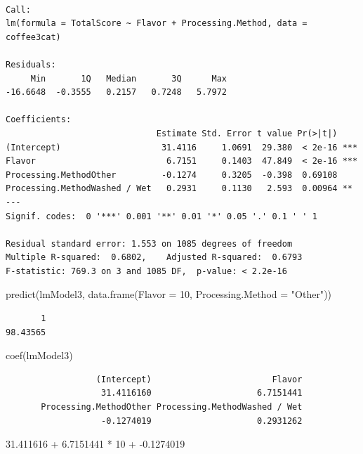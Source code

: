 \documentclass[
  letterpaper,
  DIV=11,
  numbers=noendperiod]{scrreprt}
\newenvironment{Shaded}{\begin{snugshade}}{\end{snugshade}}
\newcommand{\AttributeTok}[1]{\textcolor[rgb]{0.40,0.45,0.13}{#1}}
\newcommand{\DecValTok}[1]{\textcolor[rgb]{0.68,0.00,0.00}{#1}}
\newcommand{\FloatTok}[1]{\textcolor[rgb]{0.68,0.00,0.00}{#1}}
\newcommand{\FunctionTok}[1]{\textcolor[rgb]{0.28,0.35,0.67}{#1}}
\newcommand{\NormalTok}[1]{\textcolor[rgb]{0.00,0.23,0.31}{#1}}
\newcommand{\SpecialCharTok}[1]{\textcolor[rgb]{0.37,0.37,0.37}{#1}}
\newcommand{\StringTok}[1]{\textcolor[rgb]{0.13,0.47,0.30}{#1}}
\begin{document}
\begin{verbatim}

Call:
lm(formula = TotalScore ~ Flavor + Processing.Method, data = coffee3cat)

Residuals:
     Min       1Q   Median       3Q      Max 
-16.6648  -0.3555   0.2157   0.7248   5.7972 

Coefficients:
                              Estimate Std. Error t value Pr(>|t|)    
(Intercept)                    31.4116     1.0691  29.380  < 2e-16 ***
Flavor                          6.7151     0.1403  47.849  < 2e-16 ***
Processing.MethodOther         -0.1274     0.3205  -0.398  0.69108    
Processing.MethodWashed / Wet   0.2931     0.1130   2.593  0.00964 ** 
---
Signif. codes:  0 '***' 0.001 '**' 0.01 '*' 0.05 '.' 0.1 ' ' 1

Residual standard error: 1.553 on 1085 degrees of freedom
Multiple R-squared:  0.6802,    Adjusted R-squared:  0.6793 
F-statistic: 769.3 on 3 and 1085 DF,  p-value: < 2.2e-16
\end{verbatim}

\begin{Shaded}
\begin{Highlighting}[]
\FunctionTok{predict}\NormalTok{(lmModel3, }\FunctionTok{data.frame}\NormalTok{(}\AttributeTok{Flavor =} \DecValTok{10}\NormalTok{, }\AttributeTok{Processing.Method =} \StringTok{"Other"}\NormalTok{))}
\end{Highlighting}
\end{Shaded}

\begin{verbatim}
       1 
98.43565 
\end{verbatim}

\begin{Shaded}
\begin{Highlighting}[]
\FunctionTok{coef}\NormalTok{(lmModel3)}
\end{Highlighting}
\end{Shaded}

\begin{verbatim}
                  (Intercept)                        Flavor 
                   31.4116160                     6.7151441 
       Processing.MethodOther Processing.MethodWashed / Wet 
                   -0.1274019                     0.2931262 
\end{verbatim}

\begin{Shaded}
\begin{Highlighting}[]
\FloatTok{31.411616} \SpecialCharTok{+} \FloatTok{6.7151441} \SpecialCharTok{*} \DecValTok{10} \SpecialCharTok{+} \SpecialCharTok{{-}}\FloatTok{0.1274019}
\end{Highlighting}
\end{Shaded}
\end{document}
